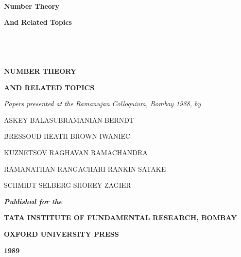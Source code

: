 ~\vfill

\begin{center}
{\Large\bf Number Theory }
\medskip

\thispagestyle{empty}

{\Large\bf And Related Topics}
\end{center}

\vfill\eject

~\phantom{a}
\thispagestyle{empty}

\vfill\eject


\thispagestyle{empty}

~

\begin{center}
{\Large\bf NUMBER THEORY}
\medskip

{\Large\bf AND RELATED TOPICS}

\medskip
\thispagestyle{empty}

{\Large\bf }
\end{center}

\vskip 1cm

\begin{center}
\textit{Papers presented at the Ramanujan Colloquium, Bombay 1988, by}
\end{center}

\smallskip

\begin{center}
ASKEY BALASUBRAMANIAN BERNDT

BRESSOUD HEATH-BROWN IWANIEC

KUZNETSOV RAGHAVAN RAMACHANDRA 

RAMANATHAN RANGACHARI RANKIN SATAKE

SCHMIDT SELBERG SHOREY ZAGIER 

\vfill

{\bf\em Published for the}
\medskip

{\large\bf TATA INSTITUTE OF FUNDAMENTAL RESEARCH, BOMBAY}

\medskip

{\large\bf OXFORD UNIVERSITY PRESS}

\smallskip

{\bf 1989}
\end{center}


\newpage

~\phantom{a}

\thispagestyle{empty}


